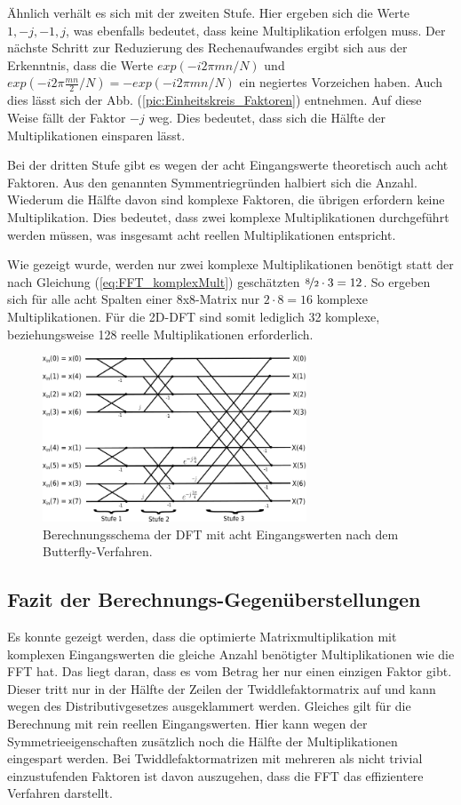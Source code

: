 Ähnlich verhält es sich mit der zweiten Stufe.
Hier ergeben sich die Werte $1, -j, -1, j$, was ebenfalls bedeutet, dass keine Multiplikation erfolgen muss. Der nächste Schritt zur Reduzierung des Rechenaufwandes ergibt sich
aus der Erkenntnis, dass die Werte $exp(-i 2 \pi m n/N)$ und $exp(-i 2 \pi \frac{m n}{2}/N) = -exp(-i 2 \pi m n/N)$  ein negiertes Vorzeichen haben. Auch dies lässt sich der 
Abb. (\ref{pic:Einheitskreis_Faktoren}) entnehmen. Auf diese Weise fällt der Faktor $-j$ weg. Dies bedeutet, dass sich die Hälfte der Multiplikationen einsparen lässt.

Bei der dritten Stufe gibt es wegen der acht Eingangswerte theoretisch auch acht Faktoren. Aus den genannten Symmentriegründen halbiert sich die Anzahl. Wiederum die Hälfte davon 
sind komplexe Faktoren, die übrigen erfordern keine Multiplikation. Dies bedeutet, dass zwei komplexe Multiplikationen durchgeführt werden müssen, was insgesamt acht reellen 
Multiplikationen entspricht. 

Wie gezeigt wurde, werden nur zwei komplexe Multiplikationen benötigt statt der nach Gleichung (\ref{eq:FFT_komplexMult}) geschätzten $\nicefrac{8}{2}\cdot 3 = 12$.
So ergeben sich für alle acht Spalten einer 8x8-Matrix nur $2\cdot8=16$ komplexe Multiplikationen. 
Für die 2D-DFT sind somit lediglich 32 komplexe, beziehungsweise 128 reelle Multiplikationen erforderlich.



\begin{figure}[htbp]
 \centering
 \includegraphics[width=0.7\textwidth]{img/Butterfly.png}
 \caption{Berechnungsschema der DFT mit acht Eingangswerten nach dem Butterfly-Verfahren.}
 \label{pic:Butterfly}
\end{figure}


\subsection{Fazit der Berechnungs-Gegenüberstellungen}
Es konnte gezeigt werden, dass die optimierte Matrixmultiplikation mit komplexen Eingangswerten die gleiche Anzahl benötigter Multiplikationen wie die FFT hat.
Das liegt daran, dass es vom Betrag her nur einen einzigen Faktor gibt. Dieser tritt nur in der Hälfte der Zeilen der Twiddlefaktormatrix auf und kann wegen des Distributivgesetzes
ausgeklammert werden. Gleiches gilt für die Berechnung mit rein reellen Eingangswerten. Hier kann wegen der Symmetrieeigenschaften zusätzlich noch die Hälfte der
Multiplikationen eingespart werden.
Bei Twiddlefaktormatrizen mit mehreren als nicht trivial einzustufenden Faktoren ist davon auszugehen, dass die FFT das effizientere Verfahren darstellt. 

